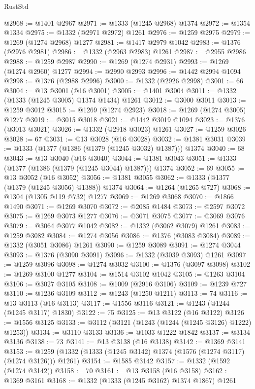 \begin{lexlean}{RustStd}
\begin{coremodule}
@2968 := @1401 @2967
@2971 := @1333 (@1245 @2968) @1374
@2972 := @1354 @1334
@2975 := @1332 (@2971 @2972) @1261
@2976 := @1259 @2975
@2979 := @1269 (@1274 @2968) @1277
@2981 := @1417 @2979 @1042
@2983 := @1376 (@2976 @2981)
@2986 := @1332 (@2963 @2983) @1261
@2987 := @2955 @2986
@2988 := @1259 @2987
@2990 := @1269 (@1274 @2931)
@2993 := @1269 (@1274 @2960) @1277
@2994 := @2990 @2993
@2996 := @1442 @2994 @1094
@2998 := @1376 (@2988 @2996)
@3000 := @1332 (@2926 @2998)
@3001 := 66
@3004 := @13 @3001 (@16 @3001)
@3005 := @1401 @3004
@3011 := @1332 (@1333 (@1245 @3005) @1374 @1434) @1261
@3012 := @3000 @3011
@3013 := @1259 @3012
@3015 := @1269 (@1274 @2923)
@3018 := @1269 (@1274 @3005) @1277
@3019 := @3015 @3018
@3021 := @1442 @3019 @1094
@3023 := @1376 (@3013 @3021)
@3026 := @1332 (@2918 @3023) @1261
@3027 := @1259 @3026
@3028 := 67
@3031 := @13 @3028 (@16 @3028)
@3032 := @1381 @3031
@3039 := @1333 (@1377 (@1386 (@1379 (@1245 @3032) @1387))) @1374
@3040 := 68
@3043 := @13 @3040 (@16 @3040)
@3044 := @1381 @3043
@3051 := @1333 (@1377 (@1386 (@1379 (@1245 @3044) @1387))) @1374
@3052 := 69
@3055 := @13 @3052 (@16 @3052)
@3056 := @1381 @3055
@3062 := @1333 (@1377 (@1379 (@1245 @3056) @1388)) @1374
@3064 := @1264 (@1265 @727)
@3068 := @1304 (@1305 @119 @732) @1277
@3069 := @1269 @3068
@3070 := @1866 @1490
@3071 := @1269 @3070
@3072 := @2085 @1484
@3073 := @2597 @3072
@3075 := @1269 @3073 @1277
@3076 := @3071 @3075
@3077 := @3069 @3076
@3079 := @3064 @3077 @1042
@3082 := @1332 (@3062 @3079) @1261
@3083 := @1259 @3082
@3084 := @1274 @3056
@3086 := @1376 (@3083 @3084)
@3089 := @1332 (@3051 @3086) @1261
@3090 := @1259 @3089
@3091 := @1274 @3044
@3093 := @1376 (@3090 @3091)
@3096 := @1332 (@3039 @3093) @1261
@3097 := @1259 @3096
@3098 := @1274 @3032
@3100 := @1376 (@3097 @3098)
@3102 := @1269 @3100 @1277
@3104 := @1514 @3102 @1042
@3105 := @1263 @3104
@3106 := @3027 @3105
@3108 := @1009 (@2916 @3106)
@3109 := @1239 @727
@3110 := @1236 @3109
@3112 := @1243 (@1250 @1211)
@3113 := 74
@3116 := @13 @3113 (@16 @3113)
@3117 := @1556 @3116
@3121 := @1243 (@1244 (@1245 @3117) @1830)
@3122 := 75
@3125 := @13 @3122 (@16 @3122)
@3126 := @1556 @3125
@3133 := @3112 (@3121 (@1243 (@1244 (@1245 @3126) @1222) @1253))
@3134 := @3110 @3133
@3136 := @1033 @1222 @1842
@3137 := @3134 @3136
@3138 := 73
@3141 := @13 @3138 (@16 @3138)
@3142 := @1369 @3141
@3153 := @1259 (@1332 (@1333 (@1245 @3142) @1374 (@1576 (@1274 @3117) (@1274 @3126))) @1261)
@3154 := @1585 @3142
@3157 := @1332 (@1592 (@1274 @3142))
@3158 := 70
@3161 := @13 @3158 (@16 @3158)
@3162 := @1369 @3161
@3168 := @1332 (@1333 (@1245 @3162) @1374 @1867) @1261

\end{coremodule}
\end{lexlean}
